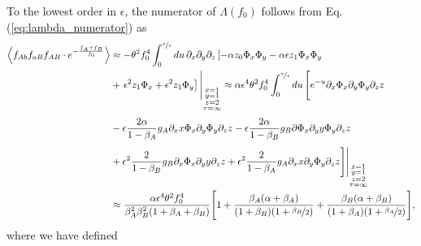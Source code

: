 \documentclass[11pt]{article}
\begin{document}
To the lowest order in $\epsilon$, the numerator of $\Lambda(f_0)$ follows from Eq. (\ref{eq:lambda_numerator}) as
\begin{align}\label{eq:lambda_num_large_rho}
    \left\langle f_{Ab}f_{aB}f_{AB}\cdot e^{-\frac{f_{A}+f_{B}}{f_0}}\right\rangle
 &\approx -\theta^2 f_0^4 \int_0^{\nicefrac{\tau}{\epsilon}} du\, \partial_x\partial_y\partial_z \left[-\alpha z_0\Phi_x\Phi_y -\alpha \epsilon z_1 \Phi_x\Phi_y \right. \\ \nonumber
 &+ \left. \epsilon^2 z_1\Phi_x + \epsilon^2 z_1\Phi_y\right]\Bigg\vert_{\substack{x=1 \\ y=1 \\ z=2 \\ \tau=\infty}} 
 \approx \alpha \epsilon^4 \theta^2 f_0^4 \int_0^{\nicefrac{\tau}{\epsilon}} du\,\Bigg[ e^{-u}\partial_x \Phi_x \partial_y \Phi_y \partial_z z 
 \Bigg. \\ \nonumber
 & - \epsilon \frac{2\alpha}{1-\beta_A} g_A \partial_x x\Phi_x \partial_y \Phi_y \partial_z z - \epsilon \frac{2\alpha}{1-\beta_B} g_B \partial \Phi_x \partial_y y \Phi_y \partial_z z\Bigg. \\ \nonumber
 &+ \Bigg. \epsilon^2 \frac{2}{1-\beta_B}g_B \partial_x \Phi_x \partial_y y \partial_z z 
 + \epsilon^2 \frac{2}{1-\beta_A}g_A \partial_x x \partial_y \Phi_y \partial_z z \Bigg]\Bigg\vert_{\substack{x=1 \\ y=1 \\ z=2 \\ \tau=\infty}} \\ \nonumber
 &\approx \frac{\alpha \epsilon^4 \theta^2 f_0^4}{\beta_A^2 \beta_B^2 (1+\beta_A+\beta_B)} \Bigg[1 + \frac{\beta_A(\alpha+\beta_A)}{(1+\beta_B)(1+\nicefrac{\beta_B}{2}) } +  \frac{\beta_B(\alpha+\beta_B)}{(1+\beta_A)(1+\nicefrac{\beta_A}{2})}\Bigg],
\end{align}
where we have defined
\end{document}
